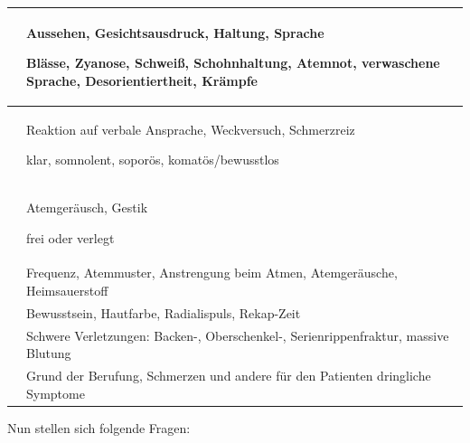 \documentclass{article}
\begin{document}
\begin{center}
\tablehead{}\begin{supertabular}{|m{3.158cm}m{10.142cm}|}
\hline
{}\par

 &
{\mdseries Aussehen, Gesichtsausdruck, Haltung, Sprache}

{\mdseries Bl\"asse, Zyanose, Schwei{\ss}, Schohnhaltung, Atemnot,
verwaschene Sprache, Des\-orientiertheit, Kr\"ampfe }

\\\hline
{}\par

 &
{\mdseries Reaktion auf verbale Ansprache, Weckversuch, Schmerzreiz}

{\mdseries klar, somnolent, sopor\"os, komat\"os/bewusstlos}

\\\hline
{}\par

 &
{\mdseries Atemger\"ausch, Gestik}

{\mdseries frei oder verlegt}

\\\hline
{}\par

 &
{\mdseries Frequenz, Atemmuster, Anstrengung beim Atmen,
Atemger\"ausche, Heimsauerstoff}

\\\hline
{}\par

 &
{\mdseries Bewusstsein, Hautfarbe, Radialispuls, Rekap-Zeit}

\\\hline
{}\par

 &
{\mdseries Schwere Verletzungen: Backen-, Oberschenkel-,
Serienrippenfraktur, massive Blutung}

\\\hline
{}\par

 &
{\mdseries Grund der Berufung, Schmerzen und andere f\"ur den Patienten
dringliche Symptome}

\\\hline
\end{supertabular}
\end{center}
{\mdseries
Nun stellen sich folgende Fragen:}
\end{document}
